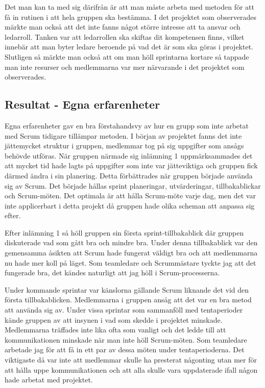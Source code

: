 Det man kan ta med sig därifrån är att man måste arbeta med metoden för att få in rutinen i att hela gruppen ska bestämma. 
I det projektet som observerades märkte man också att det inte fanns något större intresse att ta ansvar och ledarroll.
Tanken var att ledarrollen ska skiftas dit kompetensen finns, vilket innebär att man byter ledare beroende på vad det är som ska göras i projektet.
Slutligen så märkte man också att om man höll sprintarna kortare så tappade man inte resurser och medlemmarna var mer närvarande i det projektet som observerades.

\subsection{Resultat - Egna erfarenheter}
Egna erfarenheter gav en bra förstahandsvy av hur en grupp som inte arbetat med Scrum tidigare tillämpar metoden. 
I början av projektet fanns det inte jättemycket struktur i gruppen, medlemmar tog på sig uppgifter som ansågs behövde utföras. 
När gruppen närmade sig inlämning 1 uppmärksammades det att mycket tid hade lagts på uppgifter som inte var jätteviktiga och gruppen fick därmed ändra i sin planering.
Detta förbättrades när gruppen började använda sig av Scrum. 
Det började hållas sprint planeringar, utvärderingar, tillbakablickar och Scrum-möten. Det optimala är att hålla Scrum-möte varje dag, men det var inte applicerbart i detta projekt då gruppen hade olika scheman att anpassa sig efter. 

Efter inlämning 1 så höll gruppen sin första sprint-tillbakablick där gruppen diskuterade vad som gått bra och mindre bra. 
Under denna tillbakablick var den gemensamma åsikten att Scrum hade fungerat väldigt bra och att medlemmarna nu hade mer koll på läget. 
Som teamledare och Scrummästare tyckte jag att det fungerade bra, det kändes naturligt att jag höll i Scrum-processerna. 

Under kommande sprintar var känslorna gällande Scrum liknande det vid den första tillbakablicken. 
Medlemmarna i gruppen ansåg att det var en bra metod att använda sig av. Under vissa sprintar som sammanföll med tentaperioder kände gruppen av att insynen i vad som skedde i projektet minskade.
Medlemmarna träffades inte lika ofta som vanligt och det ledde till att kommunikationen minskade när man inte höll Scrum-möten. Som teamledare arbetade jag för att få in ett par av dessa möten under tentaperioderna. 
Det viktigaste då var inte att medlemmar skulle ha presterat någonting utan mer för att hålla uppe kommunikationen och att alla skulle vara uppdaterade ifall någon hade arbetat med projektet.

